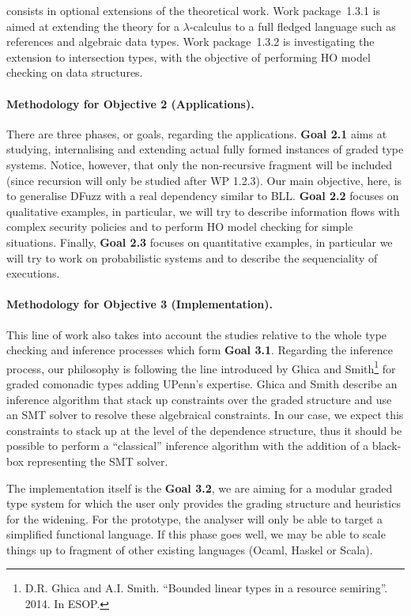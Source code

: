 \documentclass{article}[11pt]
\begin{document}
 consists in optional extensions of the theoretical work. Work package~1.3.1 is aimed at extending the theory for a $\lambda$-calculus to a full fledged language such as references and algebraic data types. Work package~1.3.2 is investigating the extension to intersection types, with the objective of performing HO model checking on data structures.


\paragraph{Methodology for Objective 2 (Applications).}

There are three phases, or goals, regarding the applications. {\bf Goal 2.1} aims at studying, internalising and extending actual fully formed instances of graded type systems. Notice, however, that only the non-recursive fragment will be included (since recursion will only be studied after WP 1.2.3). Our main objective, here, is to generalise DFuzz with a real dependency similar to BLL. {\bf Goal 2.2} focuses on qualitative examples, in particular, we will try to describe information flows with complex security policies and to perform HO model checking for simple situations. Finally, {\bf Goal 2.3} focuses on quantitative examples, in particular we will try to work on probabilistic systems and to describe the sequenciality of executions.

\paragraph{Methodology for Objective 3 (Implementation).}

This line of work also takes into account the studies relative to the whole type checking and inference processes which form {\bf Goal 3.1}. Regarding the inference process, our philosophy is following the line introduced by Ghica and Smith\footnote{D.R. Ghica and A.I. Smith. ``Bounded linear types in a resource semiring''. 2014. In ESOP.} for graded comonadic types adding UPenn's expertise. Ghica and Smith describe an inference algorithm that stack up constraints over the graded structure and use an SMT solver to resolve these algebraical constraints. In our case, we expect this constraints to stack up at the level of the dependence structure, thus it should be possible to perform a ``classical'' inference algorithm with the addition of a black-box representing the SMT solver.

The implementation itself is the {\bf Goal 3.2}, we are aiming for a modular graded type system for which the user only provides the grading structure and heuristics for the widening. For the prototype, the analyser will only be able to target a simplified functional language. If this phase goes well, we may be able to scale things up to fragment of other existing languages (Ocaml, Haskel or Scala).
\end{document}
